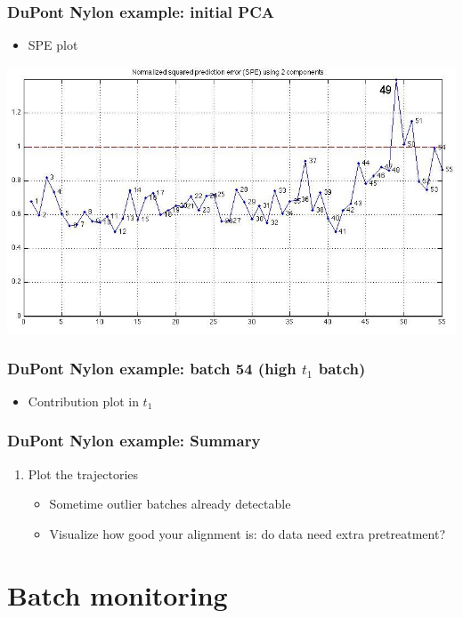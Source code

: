\documentclass[handout, 12pt]{beamer}
\begin{document}
\begin{frame}\frametitle{DuPont Nylon example: initial PCA}
	\begin{itemize}
		\item	SPE plot
	\end{itemize}
	
	\begin{center}
		\includegraphics[width=\textwidth]{images/dupont/dupont-raw-SPE.jpg}
	\end{center}
\end{frame}


\begin{frame}\frametitle{DuPont Nylon example: batch 54 (high \( t_1 \) batch)}
	\begin{itemize}
		\item	Contribution plot in \( t_1 \)
	\end{itemize}
	
	\begin{center}
	\end{center}
\end{frame}


\begin{frame}\frametitle{DuPont Nylon example: Summary}
	
\begin{enumerate}
	\item	Plot the trajectories
	
			\begin{itemize}
				\item	Sometime outlier batches already detectable
				
				\item	Visualize how good your alignment is: do data need extra pretreatment?
			\end{itemize}
\end{enumerate}


	
\end{frame}

\section{Batch monitoring}

%
\end{document}
